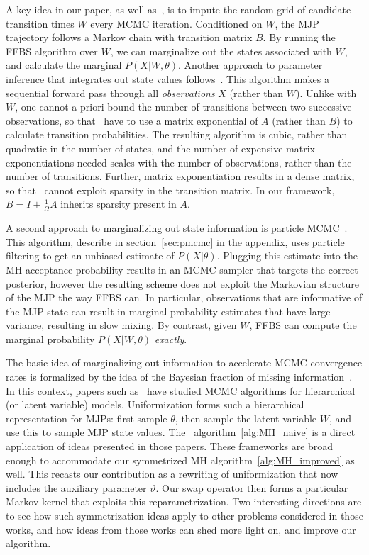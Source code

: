 A key idea in our paper, as well as~\cite{RaoTeh13}, is to impute the random grid of candidate transition times $W$ every MCMC iteration. 
Conditioned on $W$, the MJP trajectory follows a Markov chain with transition matrix $B$. 
By running the FFBS algorithm over $W$, we can marginalize out the states associated with $W$, and calculate the marginal $P(X|W,\theta)$. 
Another approach to parameter inference that integrates out state values follows~\citet{FearnSher2006}. 
 This algorithm makes a sequential forward pass through all {\em observations} $X$ (rather than $W$). 
 Unlike with $W$, one cannot a priori bound the number of transitions between two successive observations, so that~\citet{FearnSher2006} have to use a matrix exponential of $A$ (rather than $B$) to calculate transition probabilities.
 The resulting algorithm is cubic, rather than quadratic in the number of states, and the number of expensive matrix exponentiations needed scales with the number of observations, rather than the number of transitions.
 Further, matrix exponentiation results in a dense matrix, so that~\cite{FearnSher2006} cannot exploit sparsity in the transition matrix.
 In our framework, $B=I+\frac{1}{\Omega}A$ inherits sparsity present in $A$.

 A second approach to marginalizing out state information is particle MCMC~\citep{Andrieu10}. 
 This algorithm, describe in section~\ref{sec:pmcmc} in the appendix, uses particle filtering to get an unbiased estimate of $P(X|\theta)$. 
 Plugging this estimate into the MH acceptance probability results in an MCMC sampler that targets the correct posterior, however the resulting scheme does not exploit the Markovian structure of the MJP the way FFBS can. 
 In particular, observations that are informative of the MJP state can result in marginal probability estimates that have large variance, resulting in slow mixing. 
 By contrast, given $W$, FFBS can compute the marginal probability $P(X|W,\theta)$ {\em exactly}. 

The basic idea of marginalizing out information to accelerate MCMC convergence rates is formalized by the idea of the Bayesian fraction of missing information~\citep{liu1994fraction}. 
In this context, papers such as~\citet{papaspiliopoulos2007general,yu2011center} have studied MCMC algorithms for hierarchical (or latent variable) models. 
Uniformization forms such a hierarchical representation for MJPs: first sample $\theta$, then sample the latent variable $W$, and use this to sample MJP state values. 
The \naive\ algorithm~\ref{alg:MH_naive} is a direct application of ideas presented in those papers.
These frameworks are broad enough to accommodate our symmetrized MH algorithm~\ref{alg:MH_improved} as well. 
This recasts our contribution as a rewriting of uniformization that now includes the auxiliary parameter $\vartheta$. Our swap operator then forms a particular Markov kernel that exploits this reparametrization. 
Two interesting directions are to see how such symmetrization ideas apply to other problems considered in those works, and how ideas from those works can shed more light on, and improve our algorithm.

